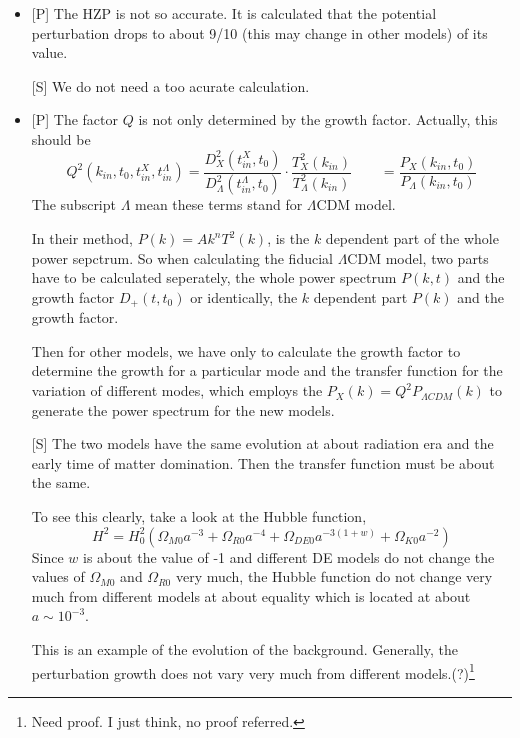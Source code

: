 \begin{itemize}

\item

[P] The HZP is not so accurate. It is calculated that the potential perturbation drops to about 9/10 (this may change in other models) of its value.

[S] We do not need a too acurate calculation.

\item

[P] The factor $Q$ is not only determined by the growth factor. Actually, this should be
\begin{equation}
Q^2(k_{in},t_0,t^X_{in},t^{\Lambda}_{in})=\frac{D^2_X(t^X_{in},t_0)}{D^2_{\Lambda}(t^{\Lambda}_{in},t_0)}\cdot\frac{T^2_X(k_{in})}{T^2_{\Lambda}(k_{in})}\qquad=\frac{P_X(k_{in},t_0)}{P_{\Lambda}(k_{in},t_0)}
\end{equation}
The subscript $\Lambda$ mean these terms stand for $\Lambda$CDM model.


In their method, $P(k)=Ak^nT^2(k)$, is the $k$ dependent part of the whole power sepctrum. So when calculating the fiducial $\Lambda$CDM model, two parts have to be calculated seperately, the whole power spectrum $P(k,t)$ and the growth factor $D_+(t,t_0)$ or identically, the $k$ dependent part $P(k)$ and the growth factor. 

Then for other models, we have only to calculate the growth factor to determine the growth for a particular mode and the transfer function for the variation of different modes, which employs the $P_X(k)=Q^2P_{\Lambda CDM}(k)$ to generate the power spectrum for the new models.

[S] \label{TransferFunctionSame} The two models have the same evolution at about radiation era and the early time of matter domination. Then the transfer function must be about the same.

To see this clearly, take a look at the Hubble function,
\begin{equation}
H^2=H_0^2(\Omega_{M0}a^{-3}+\Omega_{R0}a^{-4}+\Omega_{DE0}a^{-3(1+w)}+\Omega_{K0}a^{-2})
\end{equation}
Since $w$ is about the value of -1 and different DE models do not change the values of $\Omega_{M0}$ and $\Omega_{R0}$ very much, the Hubble function do not change very much from different models at about equality which is located at about $a\sim 10^{-3}$.

This is an example of the evolution of the background. Generally, the perturbation growth  does not vary very much from different models.(?){\footnote{Need proof. I just think, no proof referred.}}


\end{itemize}
